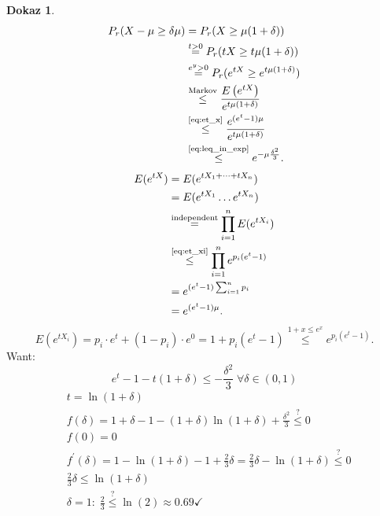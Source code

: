 \documentclass[a4paper, 12pt]{book}
\theoremstyle{definition}
\newtheorem{pro}[counter]{Dokaz}
\theoremstyle{remark}
\begin{document}
\begin{pro}
  \begin{align*}
    P_r(X - \mu \geq \delta \mu) &= P_r(X \geq \mu(1+\delta)) \\
    &\stackrel{t>0}{=} P_r(tX \geq t\mu(1+\delta)) \\
    &\stackrel{e^y>0}{=} P_r(e^{tX} \geq e^{t\mu(1+\delta)}) \\
    &\stackrel{\text{Markov}}{\leq} \frac{E\left(e^{tX}\right)}{e^{t\mu(1+\delta)}} \\
    &\stackrel{\refeq{eq:et_x}}{\leq} \frac{e^{(e^t-1)\mu}}{e^{t\mu(1+\delta)}} \\
    &\stackrel{\refeq{eq:leq_in_exp}}{\leq} e^{-\mu \frac{\delta^2}{3}}.
  \end{align*}
  \begin{align}
    E(e^{tX}) &= E(e^{tX_1 + \dots + tX_n}) \nonumber \\
    &= E(e^{tX_1} \dots e^{tX_n}) \nonumber \\
    &\stackrel{\text{independent}}{=} \prod_{i=1}^{n} E(e^{tX_i}) \nonumber \\
    &\stackrel{\refeq{eq:et_xi}}{\leq} \prod_{i=1}^{n} e^{p_i(e^t-1)} \nonumber \\
    &= e^{(e^t-1) \sum_{i=1}^{n}p_i} \nonumber \\
    &= e^{(e^t-1)\mu} \label{eq:et_x}.
  \end{align}
  \begin{equation}
    E(e^{tX_i}) = p_i \cdot e^t + (1-p_i) \cdot e^0 = 1+p_i(e^t-1) \stackrel{1+x\leq e^x}{\leq} e^{p_i(e^t-1)}.
    \label{eq:et_xi}
  \end{equation}
  Want:
  \begin{equation}
    e^t - 1 - t(1+\delta) \leq -\frac{\delta^2}{3} \; \forall \delta \in (0,1) \label{eq:leq_in_exp}
  \end{equation}
  \begin{align*}
    &t = \ln(1+\delta) \\
    &f(\delta) = 1 + \delta - 1 - (1+\delta) \ln(1+\delta) + \frac{\delta^2}{3} \stackrel{?}{\leq} 0 \\
    &f(0) = 0 \\
    &f^{'}(\delta) = 1 - \ln(1+\delta) - 1 + \frac{2}{3} \delta = \frac{2}{3} \delta - \ln(1+\delta) \stackrel{?}{\leq} 0 \\
    &\frac{2}{3} \delta \leq \ln(1+\delta) \\
    &\delta=1: \; \frac{2}{3} \stackrel{?}{\leq} \ln(2) \approx 0.69 \checkmark
  \end{align*}

\end{pro}
\end{document}
